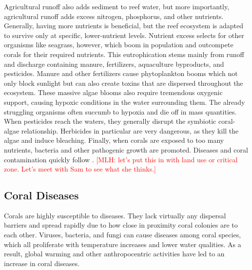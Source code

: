 \documentclass{book}\usepackage{knitr}
\newcommand{\red}[1]{\textcolor{red}{[MLH: #1]}}
\begin{document}
{	Agricultural runoff also adds sediment to reef water, but more importantly, agricultural runoff adds excess nitrogen, phosphorus, and other nutrients. Generally, having more nutrients is beneficial, but the reef ecosystem is adapted to survive only at specific, lower-nutrient levels. Nutrient excess selects for other organisms like seagrass, however, which boom in population and outcompete corals for their required nutrients. This eutrophication stems mainly from runoff and discharge containing manure, fertilizers, aquaculture byproducts, and pesticides. Manure and other fertilizers cause phytoplankton booms which not only block sunlight but can also create toxins that are dispersed throughout the ecosystem. These massive algae blooms also require tremendous oxygenic support, causing hypoxic conditions in the water surrounding them. The already struggling organisms often succumb to hypoxia and die off in mass quantities. When pesticides reach the waters, they generally disrupt the symbiotic coral-algae relationship. Herbicides in particular are very dangerous, as they kill the algae and induce bleaching. Finally, when corals are exposed to too many nutrients, bacteria and other pathogenic growth are promoted. Diseases and coral contamination quickly follow \citep{4884777420100401}.
	\red{let's put this in with land use or critical zone. Let's meet with Sam to see what she thinks.}

\subsection{Coral Diseases}\label{sub:cd}

Corals are highly susceptible to diseases. They lack virtually any dispersal barriers and spread rapidly due to how close in proximity coral colonies are to each other. Viruses, bacteria, and fungi can cause diseases among coral species, which all proliferate with temperature increases and lower water qualities. As a result, global warming and other anthropocentric activities have led to an increase in coral diseases\citep{Keller2009ClimateCC}. 

}
\end{document}

